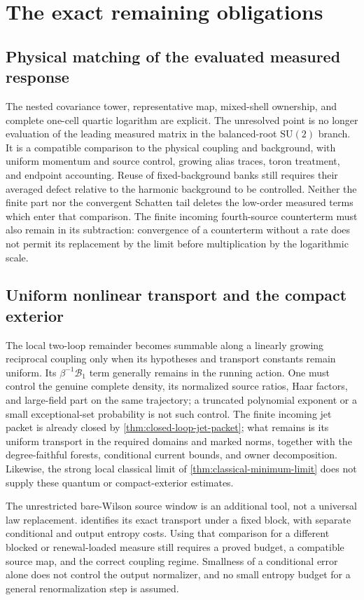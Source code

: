 \documentclass[11pt,oneside,openany]{book}
\theoremstyle{definition}
\theoremstyle{remark}
\newcommand{\SU}{\mathrm{SU}}
\begin{document}
\section{The exact remaining obligations}
\subsection{Physical matching of the evaluated measured response}
The nested covariance tower, representative map, mixed-shell ownership,
and complete one-cell quartic logarithm are explicit. The unresolved
point is no longer evaluation of the leading measured matrix in the
balanced-root $\SU(2)$ branch. It is a compatible comparison to the
physical coupling and background, with uniform momentum and source
control, growing alias traces, toron treatment, and endpoint accounting.
Reuse of fixed-background banks still requires their averaged defect
relative to the harmonic background to be controlled. Neither the
finite part nor the convergent Schatten tail deletes the low-order
measured terms which enter that comparison. The finite incoming
fourth-source counterterm must also remain in its subtraction:
convergence of a counterterm without a rate does not permit its
replacement by the limit before multiplication by the logarithmic
scale.

\subsection{Uniform nonlinear transport and the compact exterior}
The local two-loop remainder becomes summable along a linearly growing
reciprocal coupling only when its hypotheses and transport constants
remain uniform. Its $\beta^{-1}\mathcal B_1$ term generally remains in
the running action. One must control the genuine complete density,
its normalized source ratios, Haar factors, and large-field part on
the same trajectory; a truncated polynomial exponent or a small
exceptional-set probability is not such control. The finite incoming
jet packet is already closed by \cref{thm:closed-loop-jet-packet};
what remains is its uniform transport in the required domains and
marked norms, together with the degree-faithful forests, conditional
current bounds, and owner decomposition. Likewise, the strong local
classical limit of \cref{thm:classical-minimum-limit} does not supply
these quantum or compact-exterior estimates.

The unrestricted bare-Wilson source window is an additional tool,
not a universal law replacement. 
identifies its exact transport under a fixed block, with separate
conditional and output entropy costs. Using that comparison for a
different blocked or renewal-loaded measure still requires a proved
budget, a compatible source map, and the correct coupling regime.
Smallness of a conditional error alone does not control the output
normalizer, and no small entropy budget for a general renormalization
step is assumed.
\end{document}
